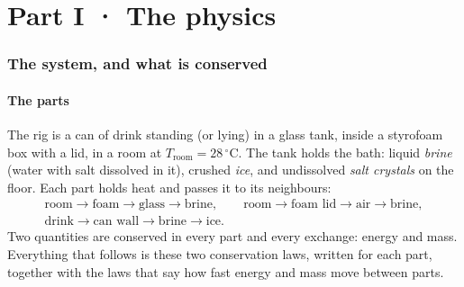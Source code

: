 \documentclass[11pt,a4paper]{article}
\newcommand{\dC}{\,^{\circ}\mathrm{C}}
\begin{document}
\part*{Part I · The physics}

\section{The system, and what is conserved}
\label{sec:conservation}

\subsection{The parts}
The rig is a can of drink standing (or lying) in a glass tank, inside a styrofoam box with a lid, in
a room at $T_{\text{room}} = 28\dC$. The tank holds the bath: liquid \emph{brine} (water with salt
dissolved in it), crushed \emph{ice}, and undissolved \emph{salt crystals} on the floor. Each part
holds heat and passes it to its neighbours:
\begin{gather*}
\text{room} \to \text{foam} \to \text{glass} \to \text{brine},\qquad
\text{room} \to \text{foam lid} \to \text{air} \to \text{brine},\\
\text{drink} \to \text{can wall} \to \text{brine} \to \text{ice}.
\end{gather*}
Two quantities are conserved in every part and every exchange: energy and mass. Everything that
follows is these two conservation laws, written for each part, together with the laws that say how
fast energy and mass move between parts.
\end{document}
